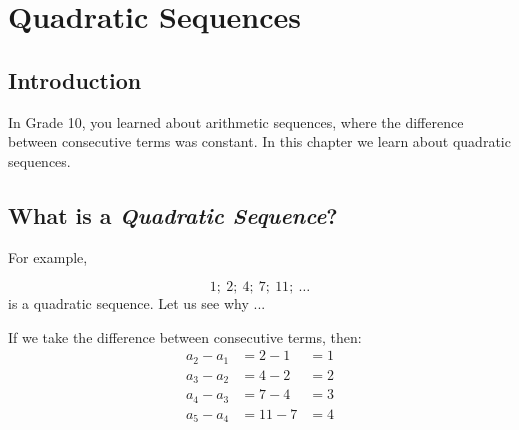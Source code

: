\chapter{Quadratic Sequences}
\label{m:pin:g11}


\section{Introduction}
In Grade 10, you learned about arithmetic sequences, where the difference between consecutive terms was constant. In this chapter we learn about quadratic sequences.

\section{What is a \textit{Quadratic Sequence}?}


For example, 

\begin{equation}
\label{eq:mp:s:quadseq:1}
1; \: 2; \: 4; \: 7; \: 11; \: \ldots
\end{equation}
is a quadratic sequence. Let us see why ... 

If we take the difference between consecutive terms, then:
\begin{eqnarray*}
a_2 - a_1 &= 2 - 1 &= 1 \\
a_3 - a_2 &= 4 - 2 &= 2 \\
a_4 - a_3 &= 7 - 4 &= 3 \\
a_5 - a_4 &= 11 - 7 &= 4
\end{eqnarray*}


